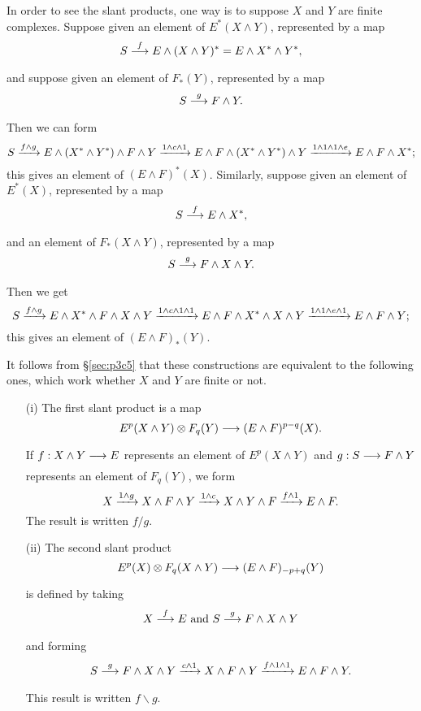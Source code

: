 \documentclass[../main]{subfiles}
\begin{document}
In order to see the slant products, one way is to suppose \(X\) and \(Y\) are finite complexes. Suppose given an element of \(E^\ast(X \wedge Y)\), represented by a map
\[S \lar{f} E \wedge (X \wedge Y)^\ast = E \wedge X^\ast \wedge Y^\ast,\]
and suppose given an element of $F_\ast(Y)$, represented by a map 
\[S \lar{g} F \wedge Y.\]
Then we can form
\[S \vra{f \wedge g} E \wedge (X^\ast \wedge Y^\ast) \wedge F \wedge Y \vra{1 \wedge c \wedge 1} E \wedge F \wedge (X^\ast \wedge Y^\ast) \wedge Y \vra{1 \wedge 1 \wedge 1 \wedge e} E \wedge F \wedge X^\ast;\]
this gives an element of $(E \wedge F)^\ast(X)$. Similarly, suppose given an element of $E^\ast(X)$, represented by a map 
\[S \lar{f} E \wedge X^\ast,\]
and an element of $F_\ast(X \wedge Y)$, represented by a map 
\[S \lar{g} F \wedge X \wedge Y.\]
Then we get
\[S \vra{f \wedge g} E \wedge X^\ast \wedge F \wedge X \wedge Y \vra{1 \wedge c \wedge 1 \wedge 1} E \wedge F \wedge X^\ast \wedge X \wedge Y \vra{1 \wedge 1 \wedge e \wedge 1} E \wedge F \wedge Y;\]
this gives an element of $(E \wedge F)_\ast(Y)$.

It follows from \S\ref{sec:p3c5} that these constructions are equivalent to the following ones, which work whether $X$ and $Y$ are finite or not. 
\begin{enumerate}
	\item[(i)] The first slant product is a map \[E^p(X \wedge Y) \otimes F_q(Y) \lar{} (E \wedge F)^{p - q}(X).\] 
	If $f : X \wedge Y \lar{} E$ represents an element of $E^p(X \wedge Y)$ and $g : S \lar {} F \wedge Y$ represents an element of $F_q(Y)$, we form
	\[X \lar {1 \wedge g} X \wedge F \wedge Y \lar {1 \wedge c} X \wedge Y \wedge F \lar {f \wedge 1} E \wedge F.\]
	The result is written $f/g$.
	\item[(ii)] The second slant product \[E^p(X) \otimes F_q(X \wedge Y) \lar{} (E \wedge F)_{-p + q}(Y)\] is defined by taking \[X \lar{f} E \text { and } S \lar{g} F \wedge X \wedge Y\] and forming \[S \lar{g} F \wedge X \wedge Y \vra{c \wedge 1} X \wedge F \wedge Y\vra{f \wedge 1 \wedge 1} E \wedge F \wedge Y.\] This result is written $f \backslash g$. 
\end{enumerate} 
\end{document}
